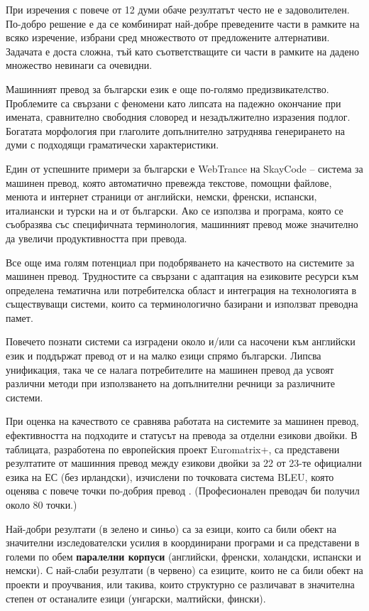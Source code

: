 \begin{multicols}{2}
  При изречения с повече от 12 думи обаче резултатът често не е задоволителен. По-добро решение е да се комбинират най-добре преведените части в рамките на всяко изречение, избрани сред множеството от предложените алтернативи. 
  Задачата е доста сложна, тъй като съответстващите си части в рамките на дадено множество невинаги са очевидни.

  Машинният превод за български език е още по-голямо предизвикателство. Проблемите са свързани с феномени като липсата на падежно окончание при имената, сравнително свободния словоред и незадължително изразения подлог. Богатата морфология при глаголите допълнително затруднява генерирането на думи с подходящи граматически характеристики.

  Един от успешните примери за български е WebTrance на SkayCode – система за машинен превод, която автоматично превежда текстове, помощни файлове, менюта и интернет страници от английски, немски, френски, испански, италиански и турски на и от български. Ако се използва и програма, която се съобразява със специфичната терминология, машинният превод може значително да увеличи продуктивността при превода.

 Все още има голям потенциал при подобряването на качеството на системите за машинен превод. Трудностите са свързани с адаптация на езиковите ресурси към определена тематична или потребителска област и интеграция на технологията в
   съществуващи системи, които са терминологично базирани и използват преводна памет.

  Повечето познати системи са изградени около и/или са насочени към английски език и поддържат превод от и на малко езици спрямо български. Липсва унификация, така че се налага потребителите на машинен превод да усвоят
   различни методи при използването на допълнителни речници за различните системи.

  При оценка на качеството се сравнява работата на системите за
   машинен превод, ефективността на подходите и статусът на превода за отделни
   езикови двойки. В таблицата, разработена по европейския проект
   Euromatrix+, са представени резултатите от машинния
   превод между езикови двойки за 22 от 23-те официални езика на ЕС
   (без ирландски), изчислени по точковата система BLEU, която оценява с повече точки по-добрия превод \cite{bleu1}. (Професионален преводач би получил около 80 точки.)

  Най-добри резултати (в зелено и синьо) са за езици, които са били обект на значителни изследователски усилия в координирани програми и са представени в големи по обем \textbf{паралелни корпуси} (английски, френски, холандски, испански и немски). С най-слаби резултати (в червено) са езиците, които не са били обект на проекти и проучвания, или такива, които структурно се различават в значителна степен от останалите езици (унгарски, малтийски, фински).


\end{multicols}
